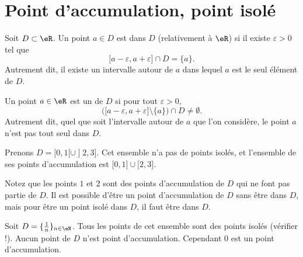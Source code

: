\section{Point d'accumulation, point isolé}

Soit $D\subset\eR$. Un point $a\in D$ est  dans $D$ (relativement à $\eR$) si il existe $\varepsilon>0$ tel que 
\begin{equation}
	\mathopen[ a-\varepsilon , a+\varepsilon \mathclose]\cap D=\{ a \}.
\end{equation}
Autrement dit, il existe un intervalle autour de $a$ dans lequel $a$ est le seul élément de $D$.

Un point $a\in \eR$ est un  de $D$ si pour tout $\varepsilon>0$, 
\begin{equation}
	\Big( \mathopen[ a-\varepsilon , a+\varepsilon \mathclose]\setminus\{ a \} \Big)\cap D\neq\emptyset.
\end{equation}
Autrement dit, quel que soit l'intervalle autour de  $a$ que l'on considère, le point $a$ n'est pas tout seul dans $D$.

\begin{example}
	Prenons $D=\mathopen[ 0 , 1 [\cup\mathopen] 2 , 3 \mathclose]$. Cet ensemble n'a pas de points isolés, et l'ensemble de ses points d'accumulation est $\mathopen[ 0 , 1 \mathclose]\cup\mathopen[ 2,3  \mathclose]$.

	Notez que les points $1$ et $2$ sont des points d'accumulation de $D$ qui ne font pas partie de $D$. Il est possible d'être un point d'accumulation de $D$ sans être dans $D$, mais pour être un point isolé dans $D$, il faut être dans $D$.
\end{example}

\begin{example}
	Soit $D=\{ \frac{1}{ n }\}_{n\in\eN}$. Tous les points de cet ensemble sont des points isolés (vérifier !).  Aucun point de $D$ n'est point d'accumulation. Cependant $0$ est un point d'accumulation.
\end{example}

\cite{GGIibHE}


